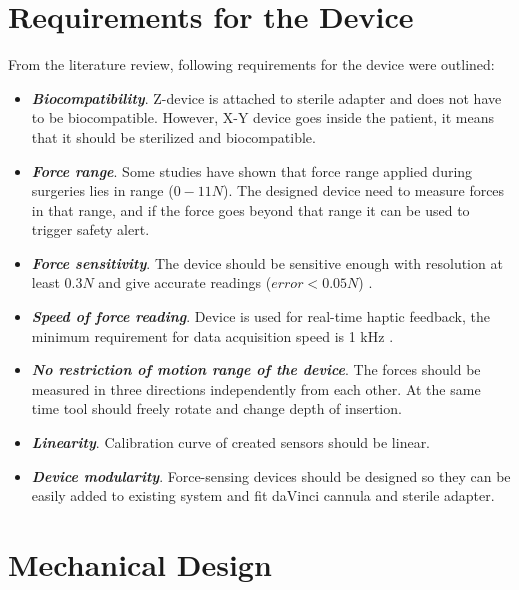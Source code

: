 \section{Requirements for the Device}
	\label{sec:DevReq}
	From the literature review, following requirements for the device were outlined:
\begin{itemize}
	\item \textbf{\textit{Biocompatibility}}. Z-device is attached to sterile adapter and does not have to be biocompatible. However, X-Y device goes inside the patient, it means that it should be sterilized and biocompatible.
	
	\item \textbf{\textit{Force range}}. Some studies \cite{mack_interactive_2012, prasad_modular_2003 } have shown that force range applied during surgeries lies in range ($0-11 N$). The designed device need to measure forces in that range, and if the force goes beyond that range it can be used to trigger safety alert.
	
	\item \textbf{\textit{Force sensitivity}}. The device should be sensitive enough with resolution at least $0.3 N$ and give accurate readings ($error < 0.05 N$) \cite{mack_interactive_2012}.
	
	\item \textbf{\textit{Speed of force reading}}. Device is used for real-time haptic feedback, the minimum requirement for data acquisition speed is 1 kHz \cite{seungmoon_choi_effect_2004}.
	
	\item \textbf{\textit{No restriction of motion range of the device}}. The forces should be measured  in three directions independently from each other. At the same time tool should freely rotate and change depth of insertion.	
	
	\item \textbf{\textit{Linearity}}. Calibration curve of created sensors should be linear.

	\item \textbf{\textit{Device modularity}}. Force-sensing devices should be designed so they can be easily added to existing system and fit daVinci cannula and sterile adapter.
\end{itemize}

\section{Mechanical Design}
\label{sec:mechDes}

